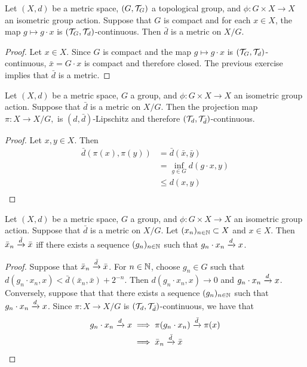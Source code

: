 \documentclass{book}
\begin{document}
	\begin{ex} \lex{}
	Let $(X, d)$ be a metric space, $(G, \mathcal{T}_G)$ a topological group, and $\phi: G \times X \rightarrow X$ an isometric group action. Suppose that $G$ is compact and for each $x \in X$, the map $g \mapsto g \cdot x$ is $(\mathcal{T}_G, \mathcal{T}_d)$-continuous. Then $\bar{d}$ is a metric on $X/G$. 
	\end{ex}
	
	\begin{proof}
	Let $x \in X$. Since $G$ is compact and the map $g \mapsto g \cdot x$ is $(\mathcal{T}_G, \mathcal{T}_d)$-continuous, $\bar{x} = G \cdot x$ is compact and therefore closed. The previous exercise implies that $\bar{d}$ is a metric.
	\end{proof}
	
	\begin{ex} \lex{}
	Let $(X, d)$ be a metric space, $G$ a group, and $\phi: G \times X \rightarrow X$ an isometric group action. Suppose that $\bar{d}$ is a metric on $X/G$. Then the projection map $\pi: X \rightarrow X/G, $ is $(d, \bar{d})$-Lipschitz and therefore $(\mathcal{T}_d, \mathcal{T}_{\bar{d}})$-continuous.
	\end{ex}
	
	\begin{proof}
	Let $x,y \in X$. Then
	\begin{align*}
	\bar{d}(\pi(x), \pi(y)) 
	&= \bar{d}(\bar{x}, \bar{y}) \\
	&= \inf_{g \in G} d(g \cdot x, y)\\
	& \leq d(x,y)  \\
	\end{align*}
	\end{proof}
	
	\begin{ex} \lex{}
	Let $(X, d)$ be a metric space, $G$ a group, and $\phi: G \times X \rightarrow X$ an isometric group action. Suppose that $\bar{d}$ is a metric on $X/G$. Let $(x_n)_{n \in \mathbb{N}} \subset X$ and $x \in X$. Then $\bar{x}_n \xrightarrow{\bar{d}} \bar{x}$ iff there exists a sequence $(g_n)_{n \in \mathbb{N}}$ such that $g_n \cdot x_n \xrightarrow{d} x$.
	\end{ex}
	
	\begin{proof} 
	Suppose that $\bar{x}_n \xrightarrow{\bar{d}} \bar{x}$. For $n \in \mathbb{N}$, choose $g_n \in G$ such that $d(g_n \cdot x_n, x) < \bar{d}(\bar{x}_n, \bar{x}) + 2^{-n}$. Then $d(g_n \cdot x_n, x) \rightarrow 0$ and $g_n \cdot x_n \xrightarrow{d} x$.  \\
	Conversely, suppose that that there exists a sequence $(g_n)_{n \in \mathbb{N}}$ such that $g_n \cdot x_n \xrightarrow{d} x$. Since $\pi:  X \rightarrow X/G$ is $(\mathcal{T}_{d}, \mathcal{T}_{\bar{d}})$-continuous, we have that
	\begin{align*}
	g_n \cdot x_n \xrightarrow{d} x
	& \implies \pi(g_n \cdot x_n) \xrightarrow{\bar{d}} \pi(x)\\
	& \implies \bar{x}_n  \xrightarrow{\bar{d}} \bar{x}
	\end{align*}
	\end{proof}		
	
\end{document}
